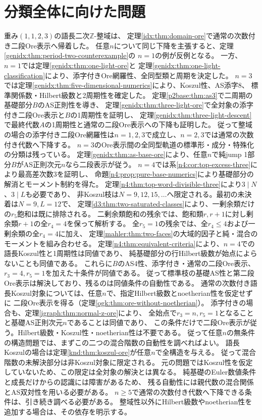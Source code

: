 \documentclass[11pt,a4paper]{ltjsarticle}
\theoremstyle{definition}
\begin{document}
\section{分類全体に向けた問題}
重み$(1,1,2,3)$の語長二次$\mathbb Z$-整域は、
定理\ref{idx:thm:domain-ore}で通常の次数付き二段Ore表示へ帰着した。
任意$n$について同じ下降を主張すると、定理\ref{genidx:thm:period-two-counterexample}の
$n=1$の例が反例となる。
一方、$n=1$では定理\ref{genidx:thm:one-light-ore}と
定理\ref{genidx:thm:one-light-classification}により、添字付きOre網羅性、全同型類と周期を決定した。
$n=3$では定理\ref{genidx:thm:five-dimensional-numerics}により、Koszul性、AS添字8、
標準関係数・Hilbert級数と2周期性を確定した。
定理\ref{p2base:thm:as3}で二周期の基礎部分$B$のAS正則性を導き、
定理\ref{genidx:thm:three-light-ore}で全対象の添字付き二段Ore表示と$B$の1周期性を証明し、
定理\ref{genidx:thm:three-light-descent}で最終代数$A$の1周期性と通常の二段Ore表示への下降も証明した。
従って整域の場合の添字付き二段Ore網羅性は$n=1,2,3$で成立し、$n=2,3$では通常の次数付き代数へ下降する。
$n=3$のOre表示間の全同型軌道の標準形・成分・特殊化の分類は残っている。
定理\ref{genidx:thm:as-base-ore}により、任意$n$で純jump 1部分$B$がAS正則次元$n$なら二段表示が従う。
$n=4$では系\ref{n4:cor:top-excess-three}により最高差次数3を証明し、
命題\ref{n4:prop:pure-base-numerics}により基礎部分の解消とモーメント制約を得た。
定理\ref{n4:thm:top-word-divisible-three}により$3\mid N$、$3\mid L$も必要であり、
非Koszul枝は$N=9,12,15,\ldots$へ限定される。最初の未決着は$N=9,L=12$で、
定理\ref{d3:thm:two-saturated-classes}により、一剰余類だけの$r_5$飽和は既に排除される。
二剰余類飽和の残余では、飽和類$r,r+1$に対し剰余類$r+1$の全$r_4=4$を保って解析する。
全$r_5=1$の残余では、全$r_4\le4$および一剰余類の全$r_4=4$に加え、
定理\ref{mahler:thm:two-faces}の大域的因子と純・混合のモーメントを組み合わせる。
定理\ref{n4:thm:equivalent-criteria}により、$n=4$での語長Koszul性と1周期性は同値であり、
純基礎部分の行Hilbert級数が始点によらないことも同値である。
これらに$B$のAS4性、添字付き・通常の二段Ore表示、$r_3=4,r_5=1$を加えた十条件が同値である。
従って標準枝の基礎AS性と第二段Ore表示は解決しており、残るのは同値条件の自動性である。
通常の次数付き語長Koszul対象については、任意$n$で、指定Hilbert級数とnoetherian性を仮定せずに
二段Ore表示を得る（定理\ref{ogk:thm:ore-without-noetherian}）。
添字付きの場合も、定理\ref{igraph:thm:normal-z-ore}により、
全始点で$r_3=n,r_5=1$となることと基礎AS正則次元$n$であることは同値であり、
この条件だけで二段Ore表示が従う。Hilbert級数・Koszul性・noetherian性は不要である。
従って任意$n$の無条件の構造問題では、まずこの二つの混合階数の自動性を調べればよい。
語長Koszulの場合は定理\ref{knd:thm:koszul-ore}が任意$n$で全構造を与える。
従って混合階数の未解決部分は非Koszul対象に限定される。
元の問題ではKoszul性を仮定していないため、この限定は全対象の解決とは異なる。
純基礎のEuler数値条件と成長だけからの認識には障害があるため、
残る自動性には親代数の混合関係とAS双対性を用いる必要がある。
$n\geq5$で通常の次数付き代数へ下降できる条件は、引き続き調べる必要がある。
整域性以外にHilbert級数やnoetherian性を追加する場合は、その依存を明示する。
\end{document}
